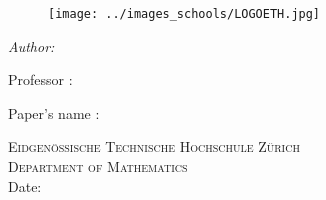\begin{titlepage}

\begin{figure}[!htb]
   \begin{minipage}{0.48\textwidth}
	  \texttt{[image: ../images\_schools/LOGOETH.jpg]} \\[1cm]
   \end{minipage}\hfill
\end{figure}

\begin{flushleft} \large
\vspace*{2 cm}
{\huge \bfseries \reporttitle} 
\vspace*{1.5 cm}

\textit{Author:} \reportauthor
\vspace*{1.5 cm}

{ Professor : \professor }

{Paper's name : \course}
\end{flushleft}

\vspace*{5 cm}
\begin{center}
\textsc{\Large Eidgenössische Technische Hochschule Zürich}\\[0.5cm] 
\textsc{\large Department of Mathematics}\\[0.5cm] 
\makeatletter
Date: \@date 
\makeatother



\end{center}

\vfill %






\end{titlepage}